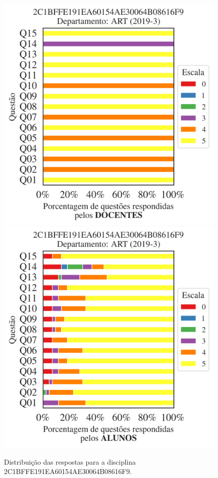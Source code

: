 \documentclass[a4paper,10pt]{article}
\begin{document}
\begin{figure}[h]
\centering
\includegraphics[width=0.485\linewidth]{analise_disciplina_departamento_ART_2C1BFFE191EA60154AE30064B08616F9_docentes.png}
\includegraphics[width=0.485\linewidth]{analise_disciplina_departamento_ART_2C1BFFE191EA60154AE30064B08616F9_alunos.png}
\caption{\label{fig:analise_geral_departamento}                Distribuição das respostas para a disciplina 2C1BFFE191EA60154AE30064B08616F9. }
\end{figure}
\end{document}
